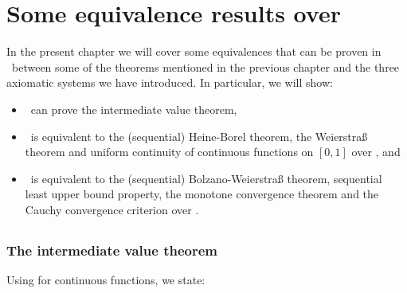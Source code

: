 \documentclass[../main.tex]{memoir}
\begin{document}
\chapter{Some equivalence results over \rca}

In the present chapter we will cover some equivalences that can be proven in \rca\ between some of the theorems mentioned in the previous chapter and the three axiomatic systems we have introduced. In particular, we will show:

\begin{itemize}
\item \rca\ can prove the intermediate value theorem,
\item \wkl\ is equivalent to the (sequential) Heine-Borel theorem, the Weierstra{\ss} theorem and uniform continuity of continuous functions on $[0, 1]$ over \rca, and
\item \aca\ is equivalent to the (sequential) Bolzano-Weierstra{\ss} theorem, sequential least upper bound property, the monotone convergence theorem and the Cauchy convergence criterion over \rca.
\end{itemize}

\section{\rca}

\subsection{The intermediate value theorem}

Using  for continuous functions, we state:
\end{document}
